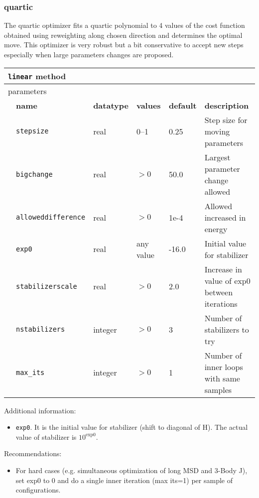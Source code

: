 \subsubsection{quartic}
The quartic optimizer fits a quartic polynomial to 4 values of the cost function obtained using reweighting along chosen direction and determines the optimal move.
This optimizer is very robust but a bit conservative to accept new steps especially when large parameters changes are proposed.
\begin{table}[h]
\begin{center}
\begin{tabularx}{\textwidth}{l l l l l l }
\hline
\multicolumn{6}{l}{\texttt{linear} method} \\
\hline
\multicolumn{2}{l}{parameters}  & \multicolumn{4}{l}{}\\
   &   \bfseries name     & \bfseries datatype & \bfseries values & \bfseries default   & \bfseries description \\
   &   \texttt{stepsize} &  real     & 0--1 & 0.25  & Step size for moving parameters\\
   &   \texttt{bigchange} &  real     & $>0$ & 50.0  & Largest parameter change allowed\\
   &   \texttt{alloweddifference} &  real     & $>0$ & 1e-4 & Allowed increased in energy\\
   &   \texttt{exp0} &  real     & any value & -16.0 & Initial value for stabilizer\\
   &   \texttt{stabilizerscale} &  real     & $>0$ & 2.0 & Increase in value of exp0 between iterations\\
   &   \texttt{nstabilizers} &  integer     & $>0$ & 3 & Number of stabilizers to try\\
   &   \texttt{max\_its} &  integer   & $>0$ & 1 & Number of inner loops with same samples\\
  \hline
\end{tabularx}
\end{center}
\end{table}

Additional information:
\begin{itemize}
\item \texttt{exp0}. It is the initial value for stabilizer (shift to diagonal of H). The actual value of stabilizer is $10^\textrm{exp0}$.
\end{itemize}

Recommendations:
\begin{itemize}
  \item{For hard cases (e.g. simultaneous optimization of long MSD and 3-Body J), set exp0
to 0 and do a single inner iteration (max its=1) per sample of configurations.}
\end{itemize}

